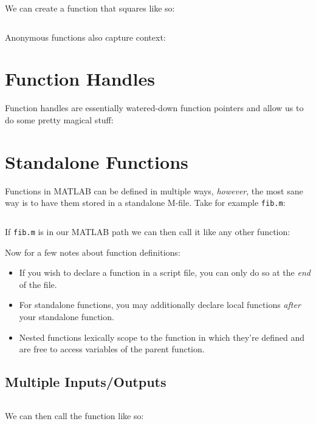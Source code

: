 \documentclass{article}
\begin{document}
We can create a function that squares like so:

\inputminted{matlab}{04-functions.d/sq.m}

Anonymous functions also capture context:


\section{Function Handles}

Function handles are essentially watered-down function pointers and
allow us to do some pretty magical stuff:


\section{Standalone Functions}

Functions in MATLAB can be defined in multiple ways, \emph{however}, the
most sane way is to have them stored in a standalone M-file.  Take for
example \texttt{fib.m}:

\inputminted{matlab}{04-functions.d/fib.m}

If \texttt{fib.m} is in our MATLAB path we can then call it like any
other function:


\newpage

Now for a few notes about function definitions:

\begin{itemize}
	\item
		If you wish to declare a function in a script file, you
		can only do so at the \emph{end} of the file.

	\item
		For standalone functions, you may additionally declare
		local functions \emph{after} your standalone function.

	\item
		Nested functions lexically scope to the function in
		which they're defined and are free to access variables
		of the parent function.
\end{itemize}

\subsection{Multiple Inputs/Outputs}


\inputminted{matlab}{04-functions.d/outer_product.m}

We can then call the function like so:

\end{document}
